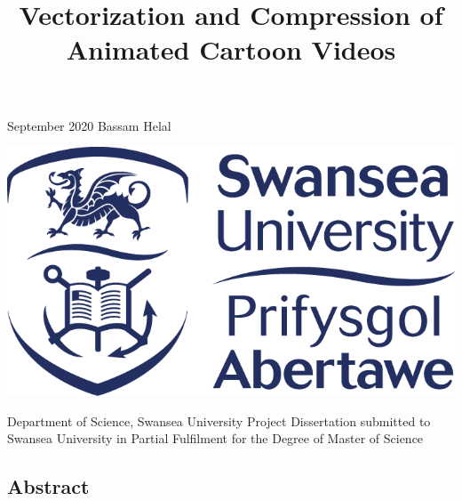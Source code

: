 \documentclass[12pt]{article}
\title{Vectorization and Compression of Animated Cartoon Videos}
\author{}
\date{}
\begin{document}

    \maketitle %

    \begin{center}
        \vspace{5cm}
        \large
        September 2020
        \linebreak
        \linebreak
        Bassam Helal
    \end{center}
    \begin{center}
        \vspace{2cm}
        \includegraphics[scale=0.65]{SwanseaUniversityLogo.png}
    \end{center}
    \begin{center}
        \vspace{1cm}
        \normalsize
        Department of Science, Swansea University
        \linebreak
        \linebreak
        Project Dissertation submitted to Swansea University in Partial Fulfilment for the Degree of Master of Science
    \end{center}

    \pagebreak

    \begin{center}
        \section*{Abstract}
    \end{center}
\end{document}
